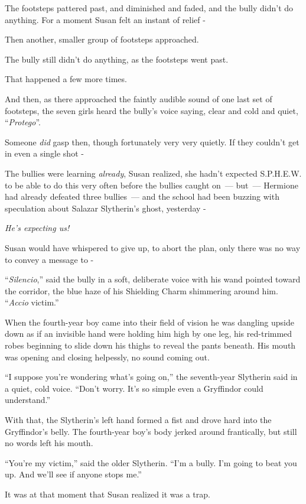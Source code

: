 The footsteps pattered past, and diminished and faded, and the bully didn't do anything. For a moment Susan felt an instant of relief -

Then another, smaller group of footsteps approached.

The bully still didn't do anything, as the footsteps went past.

That happened a few more times.

And then, as there approached the faintly audible sound of one last set of footsteps, the seven girls heard the bully's voice saying, clear and cold and quiet, ``\emph{Protego}''.

Someone \emph{did} gasp then, though fortunately very very quietly. If they couldn't get in even a single shot -

The bullies were learning \emph{already}, Susan realized, she hadn't expected S.P.H.E.W. to be able to do this very often before the bullies caught on~--- but~--- Hermione had already defeated three bullies~--- and the school had been buzzing with speculation about Salazar Slytherin's ghost, yesterday -

\emph{He's expecting us!}

Susan would have whispered to give up, to abort the plan, only there was no way to convey a message to -

``\emph{Silencio},'' said the bully in a soft, deliberate voice with his wand pointed toward the corridor, the blue haze of his Shielding Charm shimmering around him. ``\emph{Accio} victim.''

When the fourth-year boy came into their field of vision he was dangling upside down as if an invisible hand were holding him high by one leg, his red-trimmed robes beginning to slide down his thighs to reveal the pants beneath. His mouth was opening and closing helpessly, no sound coming out.

``I suppose you're wondering what's going on,'' the seventh-year Slytherin said in a quiet, cold voice. ``Don't worry. It's so simple even a Gryffindor could understand.''

With that, the Slytherin's left hand formed a fist and drove hard into the Gryffindor's belly. The fourth-year boy's body jerked around frantically, but still no words left his mouth.

``You're my victim,'' said the older Slytherin. ``I'm a bully. I'm going to beat you up. And we'll see if anyone stops me.''

It was at that moment that Susan realized it was a trap.

